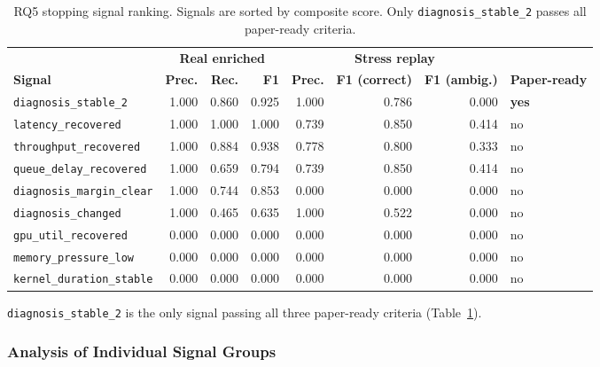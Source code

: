 \begin{table}[t]
\centering
\caption{RQ5 stopping signal ranking. Signals are sorted by composite score. Only
\texttt{diagnosis\_stable\_2} passes all paper-ready criteria.}
\label{tab:rq5-signals}
\footnotesize
\setlength{\tabcolsep}{4pt}
\renewcommand{\arraystretch}{0.95}
\begin{tabular}{lrrrrrrl}
\toprule
& \multicolumn{3}{c}{\textbf{Real enriched}} &
  \multicolumn{3}{c}{\textbf{Stress replay}} & \\
\cmidrule(lr){2-4} \cmidrule(lr){5-7}
\textbf{Signal} & \textbf{Prec.} & \textbf{Rec.} & \textbf{F1} &
\textbf{Prec.} & \textbf{F1 (correct)} & \textbf{F1 (ambig.)} &
\textbf{Paper-ready} \\
\midrule
\texttt{diagnosis\_stable\_2}   & 1.000 & 0.860 & 0.925 & 1.000 & 0.786 & 0.000 & \textbf{yes} \\
\texttt{latency\_recovered}     & 1.000 & 1.000 & 1.000 & 0.739 & 0.850 & 0.414 & no \\
\texttt{throughput\_recovered}  & 1.000 & 0.884 & 0.938 & 0.778 & 0.800 & 0.333 & no \\
\texttt{queue\_delay\_recovered}& 1.000 & 0.659 & 0.794 & 0.739 & 0.850 & 0.414 & no \\
\texttt{diagnosis\_margin\_clear}& 1.000 & 0.744 & 0.853 & 0.000 & 0.000 & 0.000 & no \\
\texttt{diagnosis\_changed}     & 1.000 & 0.465 & 0.635 & 1.000 & 0.522 & 0.000 & no \\
\texttt{gpu\_util\_recovered}   & 0.000 & 0.000 & 0.000 & 0.000 & 0.000 & 0.000 & no \\
\texttt{memory\_pressure\_low}  & 0.000 & 0.000 & 0.000 & 0.000 & 0.000 & 0.000 & no \\
\texttt{kernel\_duration\_stable}& 0.000 & 0.000 & 0.000 & 0.000 & 0.000 & 0.000 & no \\
\bottomrule
\end{tabular}
\end{table}

\texttt{diagnosis\_stable\_2} is the only signal passing all three paper-ready criteria (Table~\ref{tab:rq5-signals}).

\subsubsection{Analysis of Individual Signal Groups}

